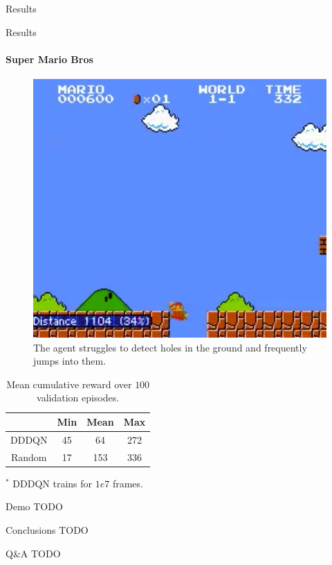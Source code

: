 \documentclass{beamer}
\begin{document}
\begin{frame}{Results}
\end{frame}



\begin{frame}{Results}
\framesubtitle{Super Mario Bros}
\begin{minipage}{\textwidth}
%
\begin{minipage}{0.4\textwidth}
\begin{figure}
\includegraphics[width=\textwidth]{img/smb_clip}
\caption*{The agent struggles to detect holes in the ground and frequently
jumps into them.}
\end{figure}
\end{minipage}
%
\hfill
%
\begin{minipage}{0.5\textwidth}
    \begin{table}
    \centering
    \caption{Mean cumulative reward over $100$ validation episodes.}
    \begin{threeparttable}
    \begin{tabular}{||c c c c||}
    \hline
    & Min & Mean & Max \\ [0.5ex]
    \hline\hline
    DDDQN & 45 & 64 & 272 \\
    \hline
    Random & 17 & 153 & 336 \\
    \hline
    \end{tabular}
    \begin{tablenotes}
        \small
        \item $^*$ DDDQN trains for $1e7$ frames.
    \end{tablenotes}
    \end{threeparttable}
    \end{table}
\end{minipage}
%
\end{minipage}
\end{frame}

\begin{frame}{Demo}
TODO
\end{frame}

\begin{frame}{Conclusions}
TODO
\end{frame}

\begin{frame}{Q\&A}
TODO
\end{frame}
\end{document}
